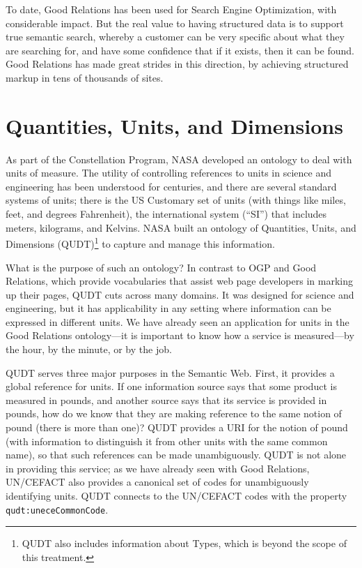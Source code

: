 To date, Good Relations has been used for Search Engine Optimization,
with considerable impact. But the real value to having structured data
is to support true semantic search, whereby a customer can be very
specific about what they are searching for, and have some confidence
that if it exists, then it can be found. Good Relations has made great
strides in this direction, by achieving structured markup in tens of
thousands of sites.

\section{Quantities, Units, and Dimensions}

As part of the Constellation Program, NASA developed an ontology to deal
with units of measure. The utility of controlling references to units in
science and engineering has been understood for centuries, and there are
several standard systems of units; there is the US Customary set of
units (with things like miles, feet, and degrees Fahrenheit), the
international system (``SI'') that includes meters, kilograms, and
Kelvins. NASA built an ontology of Quantities, Units, and Dimensions
(QUDT)\footnote{QUDT also includes information about Types, which is beyond the scope
of this treatment.}
to capture and manage this information.

What is the purpose of such an ontology? In contrast to OGP and Good
Relations, which provide vocabularies that assist web page developers in
marking up their pages, QUDT cuts across many domains. It was designed
for science and engineering, but it has applicability in any setting
where information can be expressed in different units. We have already
seen an application for units in the Good Relations ontology---it is
important to know how a service is measured---by the hour, by the
minute, or by the job.

QUDT serves three major purposes in the Semantic Web. First, it provides
a global reference for units. If one information source says that some
product is measured in pounds, and another source
says that its service is provided in pounds, how do we know that they
are making reference to the same notion of pound (there is more than
one)? QUDT provides a URI for the notion of pound (with information to
distinguish it from other units with the same common name), so that such
references can be made unambiguously. QUDT is not alone in providing
this service; as we have already seen with Good Relations, UN/CEFACT
also provides a canonical set of codes for unambiguously identifying
units. QUDT connects to the UN/CEFACT codes with the property
\texttt{qudt:uneceCommonCode}.

